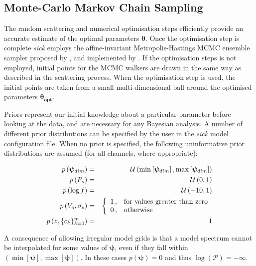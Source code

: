 \documentclass{aastex}
\newcommand{\sick}{\textit{sick}}
\begin{document}
\subsection{Monte-Carlo Markov Chain Sampling}
\label{sec:mcmc}

The random scattering and numerical optimisation steps efficiently provide an accurate estimate of the optimal parameters $\bm{\theta}$. Once the optimisation step is complete \sick{} employs the affine-invariant Metropolis-Hastings MCMC ensemble sampler proposed by \citet{goodman;weare}, and implemented by \citet{emcee}. If the optimisation steps is not employed, initial points for the MCMC walkers are drawn in the same way as described in the scattering process. When the optimisation step is used, the initial points are taken from a small multi-dimensional ball around the optimised parameters $\bm{\theta_{opt}}$. 


Priors represent our initial knowledge about a particular parameter before looking at the data, and are necessary for any Bayesian analysis. A number of different prior distributions can be specified by the user in the \sick{} model configuration file. When no prior is specified, the following uninformative prior distributions are assumed (for all channels, where appropriate):

\begin{eqnarray}
p\left(\bm{\psi}_{dim}\right) &=& \mathcal{U}\left(\min\left[\bm{\psi}_{dim}\right], \max\left[\bm{\psi}_{dim}\right]\right) \\
p\left(P_o\right) &=& \mathcal{U}\left(0, 1\right) \\
p\left(\log{f}\right) &=& \mathcal{U}\left(-10, 1\right) \\
p\left(V_o,\sigma_s\right) &=& \left\{
\begin{array}{c l}      
    1\,, &\mbox{for values greater than zero}\\
    0\,, &\mbox{otherwise}
\end{array}\right. \\
p\left(z,\{c_k\}_{k=0}^{m}\right) &=& 1 \\
\label{eq:default_priors}
\end{eqnarray} 

A consequence of allowing irregular model grids is that a model spectrum cannot be interpolated for some values of $\bm{\psi}$, even if they fall within $\left(\min\left[\bm{\psi}\right], \max\left[\bm{\psi}\right]\right)$. In these cases $p\left(\bm{\psi}\right) = 0$ and thus $\log\left(\mathcal{P}\right) = -\infty$.
\end{document}
